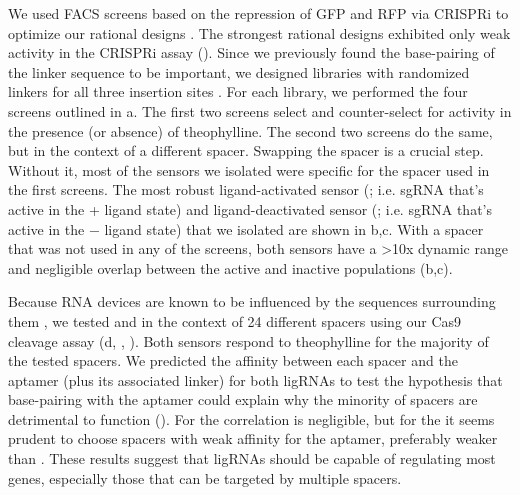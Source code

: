 \documentclass[10pt,oneside]{article}
\begin{document}
We used FACS screens based on the repression of GFP and RFP via CRISPRi to optimize our rational designs \invivo{}.  The strongest rational designs exhibited only weak activity in the CRISPRi assay ().  Since we previously found the base-pairing of the linker sequence to be important, we designed libraries with randomized linkers for all three insertion sites .  For each library, we performed the four screens outlined in a.  The first two screens select and counter-select for activity in the presence (or absence) of theophylline.  The second two screens do the same, but in the context of a different spacer.  Swapping the spacer is a crucial step.  Without it, most of the sensors we isolated were specific for the spacer used in the first screens.  The most robust ligand-activated sensor (\ligrnaF{}; i.e. sgRNA that's active in the + ligand state) and ligand-deactivated sensor (\ligrnaB{}; i.e. sgRNA that's active in the − ligand state) that we isolated are shown in b,c.  With a spacer that was not used in any of the screens, both sensors have a >10x dynamic range and negligible overlap between the active and inactive populations (b,c).
% 
% 

% 
% 
% 
% 
% 
%
Because RNA devices are known to be influenced by the sequences surrounding them \autocite{liang2012}, we tested \ligrnaF{} and \ligrnaB{} in the context of 24 different spacers using our \invitro{} Cas9 cleavage assay (d, , ).  Both sensors respond to theophylline for the majority of the tested spacers.  We predicted the affinity between each spacer and the aptamer (plus its associated linker) for both ligRNAs to test the hypothesis that base-pairing with the aptamer could explain why the minority of spacers are detrimental to function ().  For \ligrnaF{} the correlation is negligible, but for the \ligrnaB{} it seems prudent to choose spacers with weak affinity for the aptamer, preferably weaker than .  These results suggest that ligRNAs should be capable of regulating most genes, especially those that can be targeted by multiple spacers.
\end{document}
